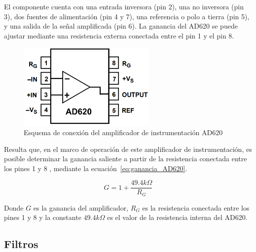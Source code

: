            El componente cuenta con una entrada inversora (pin 2), una no inversora (pin 3), dos fuentes de alimentación (pin 4 y 7), una referencia o polo a tierra (pin 5), y una salida de la señal amplificada (pin 6). La ganancia del AD620 se puede ajustar mediante una resistencia externa conectada entre el pin 1 y el pin 8.
            \begin{figure}[H]
                \centering
                \includegraphics[width=0.6\textwidth]{img/Marco/AD620_Diagrama.png}
                \caption[Esquema de conexión del amplificador de instrumentación AD620.]{Esquema de conexión del amplificador de instrumentación AD620\footnotemark}
                \label{fig:AD620_pinout}
            \end{figure}

            Resulta que, en el marco de operación de este amplificador de instrumentación, es posible determinar la ganancia saliente a partir de la resistencia conectada entre los pines 1 y 8 \cite{AD620_AnalogDevices}, mediante la ecuación~\ref{eq:ganancia_AD620}.

            \begin{equation}
                \label{eq:ganancia_AD620}
                G = 1 + \frac{49.4 k\Omega}{R_G}
            \end{equation}

            Donde $G$ es la ganancia del amplificador, $R_G$ es la resistencia conectada entre los pines 1 y 8 y la constante $49.4 k\Omega$ es el valor de la resistencia interna del AD620.

    \subsection{Filtros}

